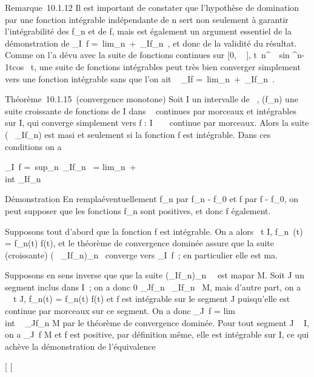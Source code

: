 \documentclass[]{article}
\begin{document}
Remarque~10.1.12 Il est important de constater que l'hypothèse de
domination par une fonction intégrable \phi indépendante de n sert non
seulement à garantir l'intégrabilité des f\_n et de f, mais est
également un argument essentiel de la démonstration de
\int  \_I~f =\
lim\_n\rightarrow~+\infty~\int  \_If\_n~,
et donc de la validité du résultat. Comme on l'a dé vu avec la suite
de fonctions continues sur {[}0, \pi~\over 2 {]},
t\mapsto~n^\alpha~\
sin ^n-1tcos~ t, une suite de
fonctions intégrables peut très bien converger simplement vers une
fonction intégrable sans que l'on ait \int ~
\_If =\
lim\_n\rightarrow~+\infty~\int  \_If\_n~.

Théorème~10.1.15~(convergence monotone) Soit I un intervalle de ~,
(f\_n) une suite croissante de fonctions de I dans ~ continues
par morceaux et intégrables sur I, qui converge simplement vers f : I \rightarrow~
\mathbb{R}~ continue par morceaux. Alors la suite (\int ~
\_If\_n) est ma\jmathorée si et seulement si la fonction f est
intégrable. Dans ces conditions on a

\int  \_I~f =\
sup\_n\in\mathbb{N}~\int  \_If\_n~
= lim\_n\rightarrow~+\infty~~\\int
 \_If\_n

Démonstration En rempla\ccant éventuellement
f\_n par f\_n - f\_0 et f par f - f\_0,
on peut supposer que les fonctions f\_n sont positives, et donc
f également.

Supposons tout d'abord que la fonction f est intégrable. On a alors
\forall~t \in I, \textbar{}f\_n~(t)\textbar{} =
f\_n(t) \leq f(t), et le théorème de convergence dominée assure que
la suite (croissante) (\int ~
\_If\_n)\_n\in{}~ converge vers
\int  \_I~f~; en particulier elle est
ma.

Supposons en sens inverse que que la suite
(\int  \_If\_n)\_n\in\mathbb{N}~~ est
ma\jmathorée par M. Soit J un segment inclus dans I~; on a donc 0
\leq\int  \_Jf\_n~
\leq\int  \_If\_n~ \leq M, mais d'autre
part, on a \forall~~t \in J,
\textbar{}f\_n(t)\textbar{} = f\_n(t) \leq f(t) et f est
intégrable sur le segment J puisqu'elle est continue par morceaux sur ce
segment. On a donc \int  \_J~f
= lim\\int ~
\_Jf\_n \leq M par le théorème de convergence dominée. Pour
tout segment J \subset~ I, on a \int  \_J~f \leq M
et f est positive, par définition même, elle est intégrable sur I, ce
qui achève la démonstration de l'équivalence

{[}
{[}
\end{document}
